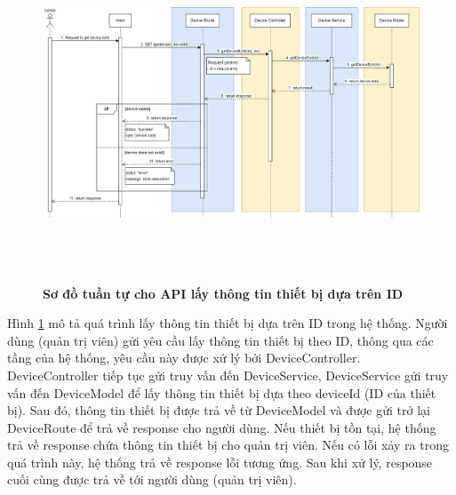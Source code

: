 \begin{figure}[H]
  \centering
  \includegraphics[width=16cm,height=10cm]{Images/sequence_api/getDeviceById.png}
  \caption[Sơ đồ tuần tự cho API lấy thông tin thiết bị dựa trên ID]{\bfseries \fontsize{12pt}{0pt}
  \selectfont Sơ đồ tuần tự cho API lấy thông tin thiết bị dựa trên ID }
  \label{api_getDeviceById} %
\end{figure}
Hình \ref{api_getDeviceById} mô tả quá trình lấy thông tin thiết bị dựa trên ID trong hệ thống. Người dùng (quản trị viên) gửi yêu cầu lấy thông tin thiết bị theo ID, thông qua các tầng của hệ thống, 
yêu cầu này được xử lý bởi DeviceController. DeviceController tiếp tục gửi truy vấn đến DeviceService, DeviceService gửi truy vấn đến DeviceModel để lấy thông tin thiết bị dựa theo deviceId (ID của thiết bị). 
Sau đó, thông tin thiết bị được trả về từ DeviceModel và được gửi trở lại DeviceRoute để trả về response cho người dùng. Nếu thiết bị tồn tại, hệ thống trả về response chứa thông tin thiết bị cho quản trị viên. Nếu có lỗi xảy ra trong quá trình này, hệ thống trả về response lỗi tương ứng. 
Sau khi xử lý, response cuối cùng được trả về tới người dùng (quản trị viên).

